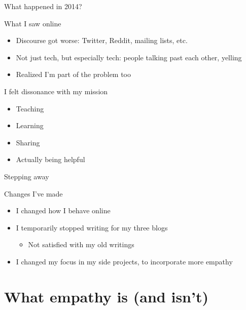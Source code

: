 \begin{frame}{What happened in 2014?}
  \begin{block}{What I saw online}
    \begin{itemize}
    \item Discourse got worse: Twitter, Reddit, mailing lists,
      etc.
    \item Not just tech, but especially tech: people talking past each
      other, yelling
    \item Realized I'm part of the problem too
    \end{itemize}
  \end{block}

  \begin{block}{I felt dissonance with my mission}
    \begin{itemize}
    \item Teaching
    \item Learning
    \item Sharing
    \item Actually being helpful
    \end{itemize}
  \end{block}
\end{frame}

\begin{frame}{Stepping away}
  \begin{block}{Changes I've made}
    \begin{itemize}
    \item I changed how I behave online
    \item I temporarily stopped writing for my three blogs
      \begin{itemize}
      \item Not satisfied with my old writings
      \end{itemize}
    \item I changed my focus in my side projects, to incorporate more empathy
    \end{itemize}
  \end{block}
\end{frame}


\section{What empathy is (and isn't)}

